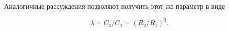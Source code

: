\documentclass[specialist, subf, href, colorlinks=true, 14pt, final]{disser}
\theoremstyle{definition}
\begin{document}
\begin{figure}[!htp]
  \caption{}
  \label{2-7-1}
\end{figure}

Аналогичные рассуждения позволяют получить этот же параметр в виде
\addtocounter{equation}{1}
\begin{equation}\label{eq:276}
  \lambda = C_{2}/C_{1} = (R_{2}/R_{1})^{3}.
  \tag{6}
\end{equation}
\end{document}
